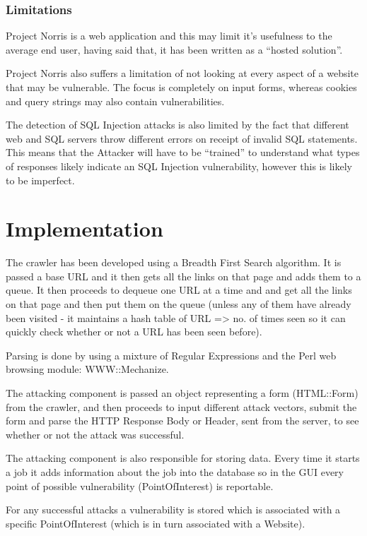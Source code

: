 \documentclass[12pt,a4paper]{article}
\begin{document}
\subsubsection{Limitations}
Project Norris is a web application and this may limit it’s usefulness to the average end user, having said that, it has been written as a “hosted solution”.

Project Norris also suffers a limitation of not looking at every aspect of a website that may be vulnerable.  The focus is completely on input forms, whereas cookies and query strings may also contain vulnerabilities.

The detection of SQL Injection attacks is also limited by the fact that different web and SQL servers throw different errors on receipt of invalid SQL statements.  This means that the Attacker will have to be “trained” to understand what types of responses likely indicate an SQL Injection vulnerability, however this is likely to be imperfect.

\section{Implementation}
The crawler has been developed using a Breadth First Search algorithm.  It is passed a base URL and it then gets all the links on that page and adds them to a queue.  It then proceeds to dequeue one URL at a time and and get all the links on that page and then put them on the queue (unless any of them have already been visited - it maintains a hash table of URL => no. of times seen so it can quickly check whether or not a URL has been seen before).

Parsing is done by using a mixture of Regular Expressions and the Perl web browsing module: WWW::Mechanize.

The attacking component is passed an object representing a form (HTML::Form) from the crawler, and then proceeds to input different attack vectors, submit the form and parse the HTTP Response Body or Header, sent from the server, to see whether or not the attack was successful.

The attacking component is also responsible for storing data.  Every time it starts a job it adds information about the job into the database so in the GUI every point of possible vulnerability (PointOfInterest) is reportable. 

For any successful attacks a vulnerability is stored which is associated with a specific PointOfInterest (which is in turn associated with a Website).
\end{document}
